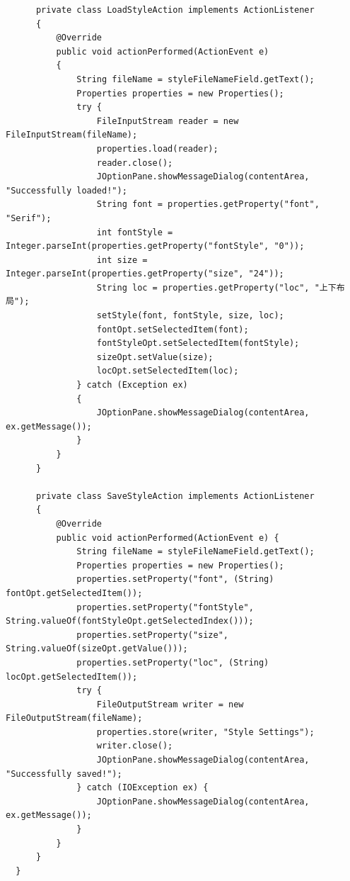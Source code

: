\documentclass[11pt]{homework}
\begin{document}
\begin{lstlisting}
      private class LoadStyleAction implements ActionListener
      {
          @Override
          public void actionPerformed(ActionEvent e)
          {
              String fileName = styleFileNameField.getText();
              Properties properties = new Properties();
              try {
                  FileInputStream reader = new FileInputStream(fileName);
                  properties.load(reader);
                  reader.close();
                  JOptionPane.showMessageDialog(contentArea, "Successfully loaded!");
                  String font = properties.getProperty("font", "Serif");
                  int fontStyle = Integer.parseInt(properties.getProperty("fontStyle", "0"));
                  int size = Integer.parseInt(properties.getProperty("size", "24"));
                  String loc = properties.getProperty("loc", "上下布局");
                  setStyle(font, fontStyle, size, loc);
                  fontOpt.setSelectedItem(font);
                  fontStyleOpt.setSelectedItem(fontStyle);
                  sizeOpt.setValue(size);
                  locOpt.setSelectedItem(loc);
              } catch (Exception ex)
              {
                  JOptionPane.showMessageDialog(contentArea, ex.getMessage());
              }
          }
      }
  
      private class SaveStyleAction implements ActionListener
      {
          @Override
          public void actionPerformed(ActionEvent e) {
              String fileName = styleFileNameField.getText();
              Properties properties = new Properties();
              properties.setProperty("font", (String) fontOpt.getSelectedItem());
              properties.setProperty("fontStyle", String.valueOf(fontStyleOpt.getSelectedIndex()));
              properties.setProperty("size", String.valueOf(sizeOpt.getValue()));
              properties.setProperty("loc", (String) locOpt.getSelectedItem());
              try {
                  FileOutputStream writer = new FileOutputStream(fileName);
                  properties.store(writer, "Style Settings");
                  writer.close();
                  JOptionPane.showMessageDialog(contentArea, "Successfully saved!");
              } catch (IOException ex) {
                  JOptionPane.showMessageDialog(contentArea, ex.getMessage());
              }
          }
      }
  }
\end{lstlisting}
\end{document}
